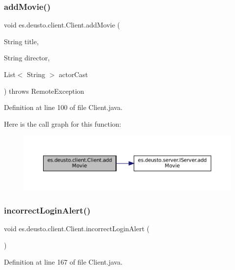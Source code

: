 \subsubsection{\texorpdfstring{addMovie()}{addMovie()}}
{\footnotesize\ttfamily void es.\+deusto.\+client.\+Client.\+add\+Movie (\begin{DoxyParamCaption}\item[{String}]{title,  }\item[{String}]{director,  }\item[{List$<$ String $>$}]{actor\+Cast }\end{DoxyParamCaption}) throws Remote\+Exception}



Definition at line 100 of file Client.\+java.

Here is the call graph for this function\+:\nopagebreak
\begin{figure}[H]
\begin{center}
\leavevmode
\includegraphics[width=350pt]{classes_1_1deusto_1_1client_1_1_client_ab3ebcc9daf4719fe0c9354a49d5957e4_cgraph}
\end{center}
\end{figure}
\mbox{\label{classes_1_1deusto_1_1client_1_1_client_a8bbc4a71a4aaff50bfe419a724898790}} 
\subsubsection{\texorpdfstring{incorrectLoginAlert()}{incorrectLoginAlert()}}
{\footnotesize\ttfamily void es.\+deusto.\+client.\+Client.\+incorrect\+Login\+Alert (\begin{DoxyParamCaption}{ }\end{DoxyParamCaption})}



Definition at line 167 of file Client.\+java.

